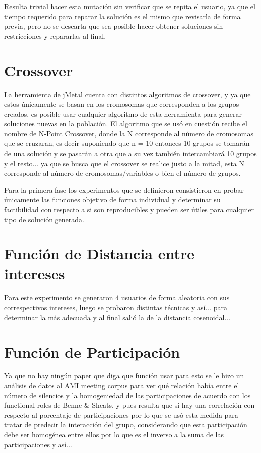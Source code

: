 Resulta trivial hacer esta mutación sin verificar que se repita el usuario, ya que el tiempo requerido para reparar la solución es el mismo que revisarla de forma previa, pero no se descarta que sea posible hacer obtener soluciones sin restricciones y repararlas al final.

\section{Crossover}

La herramienta de jMetal cuenta con distintos algoritmos de crossover, y ya que estos únicamente se basan en los cromosomas que corresponden a los grupos creados, es posible usar cualquier algoritmo de esta herramienta para generar soluciones nuevas en la población. El algoritmo que se usó en cuestión recibe el nombre de N-Point Crossover, donde la N corresponde al número de cromosomas que se cruzaran, es decir suponiendo que n = 10 entonces 10 grupos se tomarán de una solución y se pasarán a otra que a su vez también intercambiará 10 grupos y el resto... ya que se busca que el crossover se realice justo a la mitad, esta N corresponde al número de cromosomas/variables o bien el número de grupos.

Para la primera fase los experimentos que se definieron consistieron en probar únicamente las funciones objetivo de forma individual y determinar su factibilidad con respecto a si son reproducibles y pueden ser útiles para cualquier tipo de solución generada.

\section{Función de Distancia entre intereses}

Para este experimento se generaron 4 usuarios de forma aleatoria con sus correspectivos intereses, luego se probaron distintas técnicas y así... para determinar la más adecuada y al final salió la de la distancia cosenoidal...

\section{Función de Participación}

Ya que no hay ningún paper que diga que función usar para esto se le hizo un análisis de datos al AMI meeting corpus para ver qué relación había entre el número de silencios y la homogeniedad de las participaciones de acuerdo con los functional roles de Benne & Sheats, y pues resulta que si hay una correlación con respecto al porcentaje de participaciones por lo que se usó esta medida para tratar de predecir la interacción del grupo, considerando que esta participación debe ser homogénea entre ellos por lo que es el inverso a la suma de las participaciones y así...

